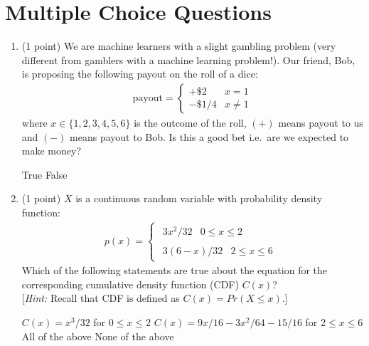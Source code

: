 
\section{Multiple Choice Questions}
\begin{enumerate}[start]
\item (1 point)
We are machine learners with a slight gambling problem 
(very different from gamblers with a machine learning problem!). 
Our friend, Bob, is proposing the following payout on the roll of a dice:
%
\begin{align}
\text{payout} = \left\{ {\begin{array}{*{20}{c}}
{+\$2}&{x = 1}\\
{-\$1/4}&{x \ne 1}
\end{array}} \right.
\end{align}
%
where $x \in \{ 1,2,3,4,5,6\} $ is the outcome of the roll, $(+)$ means payout to us and $(-)$ means payout to Bob. Is this a good bet i.e.\ are we expected to make money?

\begin{oneparcheckboxes}
\choice True
\choice False
\end{oneparcheckboxes}

\item (1 point)
$X$ is a continuous random variable with probability density function:
%
\begin{align}
p(x) = \left\{ {\begin{array}{*{20}{c}}
{\begin{array}{*{20}{c}}
{3x^2/32}&{0 \le x \le 2}
\end{array}}\\
{\begin{array}{*{20}{c}}
{3(6-x)/32}&{2 \le x \le 6}
\end{array}}
\end{array}} \right.
\end{align}
%
Which of the following statements are true about the equation for the corresponding cumulative density function (CDF) $C(x)$?\\
{[\emph{Hint:} Recall that CDF is defined as $C(x) = Pr(X \le x)$.]}\\
\begin{checkboxes}
	\choice $C(x) = x^3/32$  for   $0 \le x \le 2 $
	\choice $C(x) = 9x/16 -3x^2/64 - 15/16$ for  $2 \le x \le 6$
	\choice All of the above
	\choice None of the above
\end{checkboxes}


\end{enumerate}

